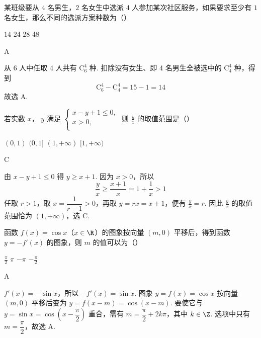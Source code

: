 \begin{problem}
某班级要从 \(4\) 名男生，\(2\) 名女生中选派 \(4\) 人参加某次社区服务，如果要求至少有 \(1\) 名女生，那么不同的选派方案种数为（\quad）

\choices
    {\(14\)}
    {\(24\)}
    {\(28\)}
    {\(48\)}
\begin{answer}
A
\end{answer}
\begin{solution}
从 6 人中任取 4 人共有 \(\mathrm C_6^4\) 种. 扣除没有女生、即 4 名男生全被选中的 \(\mathrm C_4^4\) 种，得到
\[
\mathrm C_6^4-\mathrm C_4^4=15-1=14
\]
故选 A.
\end{solution}
\end{problem}

\begin{problem}
若实数 \(x\)， \(y\) 满足 \(\begin{cases}
x - y + 1 \leqslant 0,\\
x > 0,\\
\end{cases}\) 则 \(\frac{y}{x}\) 的取值范围是（\quad）

\choices
    {\((0,1)\)}
    {\((0,1]\)}
    {\((1, +\infty)\)}
    {\([1, +\infty)\)}
\begin{answer}
C
\end{answer}
\begin{solution}
由 \(x-y+1\leqslant0\) 得 \(y\geqslant x+1\). 因为 \(x>0\)，所以
\[
\frac yx\geqslant\frac{x+1}{x}=1+\frac1x>1
\]
任取 \(r>1\)，取 \(x=\dfrac1{r-1}>0\)，再取 \(y=rx=x+1\)，便有 \(\frac{y}{x}=r\). 因此 \(\frac{y}{x}\) 的取值范围恰为 \((1,+\infty)\)，选 C.
\end{solution}
\end{problem}

\begin{problem}
函数 \( f(x) = \cos x \)（\(x \in \R\)）的图象按向量 \((m, 0)\) 平移后，得到函数 \( y = -f'(x) \) 的图象，则 \( m \) 的值可以为（\quad）

\choices
    {\(\frac{\pi}{2}\)}
    {\(\pi\)}
    {\(-\pi\)}
    {\(-\frac{\pi}{2}\)}
\begin{answer}
A
\end{answer}
\begin{solution}
\(f'(x)=-\sin x\)，所以 \(-f'(x)=\sin x\). 图象 \(y=f(x)=\cos x\) 按向量 \((m,0)\) 平移后变为
\(y=f(x-m)=\cos(x-m)\). 要使它与 \(y=\sin x=\cos\left(x-\dfrac\pi2\right)\) 重合，需有 \(m=\dfrac\pi2+2k\pi\)，其中 \(k\in\Z\). 选项中只有 \(m=\dfrac\pi2\)，故选 A.
\end{solution}
\end{problem}

